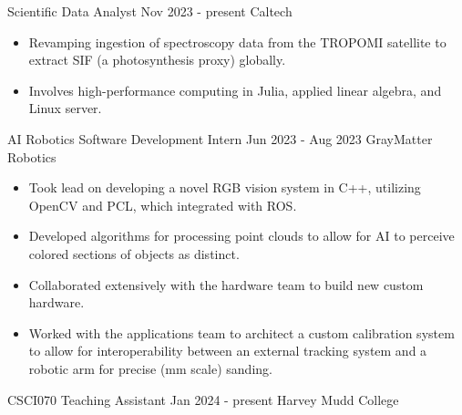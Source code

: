 \documentclass[9pt]{resume}
\begin{document}
    
    \vspace{0.5cm}

    \begin{experiencelist}
        \experience
            {Scientific Data Analyst}
            {Nov 2023 - present}
            {Caltech}
            {\begin{itemize}[noitemsep, topsep=1pt]
                \item Revamping ingestion of spectroscopy data from the TROPOMI satellite to extract SIF (a photosynthesis proxy) globally. 
                \item Involves high-performance computing in Julia, applied linear algebra, and Linux server.
            \end{itemize}}
        \experience 
            {AI Robotics Software Development Intern}
            {Jun 2023 - Aug 2023}
            {GrayMatter Robotics}
            {\begin{itemize}[noitemsep, topsep=1pt]
                \item Took lead on developing a novel RGB vision system in C++, utilizing OpenCV and PCL, which integrated with ROS.
                \item Developed algorithms for processing point clouds to allow for AI to perceive colored sections of objects as distinct.
                \item Collaborated extensively with the hardware team to build new custom hardware.
                \item Worked with the applications team to architect a custom calibration system to allow for interoperability between an external tracking system and a robotic arm for precise (mm scale) sanding.
            \end{itemize}}
        \experience
            {CSCI070 Teaching Assistant}
            {Jan 2024 - present}
            {Harvey Mudd College}
            {}

\end{experiencelist}
\end{document}
